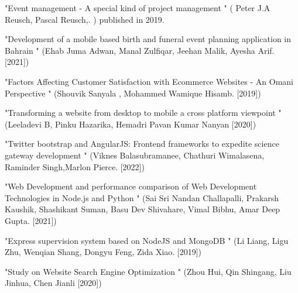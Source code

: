 \newpage
{}
\begin{thebibliography}{99}
	 "Event management - A special kind of project management
	" ( Peter J.A Reusch, Pascal Reusch,.
	) published in 2019.
	
	"Development of a mobile based birth and funeral event planning application in Bahrain
	"
	(Ehab Juma Adwan, Manal Zulfiqar, Jeehan Malik, Ayesha Arif.
	[2021])
	
	"Factors Affecting Customer Satisfaction with Ecommerce Websites - An Omani Perspective
	"
	(Shouvik Sanyala , Mohammed Wamique Hisamb.
	[2019])
	
	"Transforming a website from desktop to mobile a cross platform viewpoint
	"
	(Leeladevi B, Pinku Hazarika, Hemadri Pavan Kumar Nanyan
	[2020])
	
	"Twitter bootstrap and AngularJS: Frontend frameworks to expedite science gateway development
	"
	(Viknes Balasubramanee, Chathuri Wimalasena, Raminder Singh,Marlon
	Pierce.
	[2022])
	
	"Web Development and performance comparison of Web Development Technologies in Node.js and Python
	"
	(Sai Sri Nandan Challapalli, Prakarsh Kaushik, Shashikant Suman, Basu Dev Shivahare, Vimal Bibhu, Amar Deep Gupta.
	[2021])
	
	"Express supervision system based on NodeJS and MongoDB
	"
	(Li Liang, Ligu Zhu, Wenqian Shang, Dongyu Feng, Zida Xiao.
	[2019])
	
	"Study on Website Search Engine Optimization
	" (Zhou Hui, Qin Shingang, Liu Jinhua, Chen Jianli
	[2020])





\end{thebibliography}


